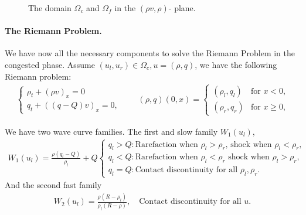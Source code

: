 \documentclass[10pt]{article}
\numberwithin{equation}{section}
\begin{document}

\begin{figure}
    \centering
    
    \caption{The domain $\Omega_c$ and $\Omega_f$ in the $(\rho v , \rho)$- plane.}
    \label{fig:RhoVFigure}
\end{figure}


\paragraph{The Riemann Problem.}
We have now all the necessary components to solve the Riemann Problem in the congested phase. Assume $(u_l, u_r) \in \Omega_c, u = (\rho, q)$, we have the following Riemann problem: 
\begin{align}
     \begin{cases} \rho_t + (\rho v)_x = 0 \\
     q_t + ((q-Q)v)_x = 0 ,
    \end{cases} \quad \quad (\rho, q) (0,x) = \begin{cases}
    (\rho_l, q_l) & \text{for $x < 0$,} \\
    (\rho_r, q_r) &  \text{for $x \geq 0$,}
    \end{cases}
    \label{Eq:RPCongestedPhase}
\end{align}

We have two wave curve families. The first and slow family $W_1(u_l)$, 
\begin{align*}
     W_1(u_l) = \frac{\rho( q_l - Q)}{\rho_l} + Q  \begin{cases}
          q_l > Q:  \text{Rarefaction when $\rho_l > \rho_r$, shock when $\rho_l < \rho_r$,}\\
          q_l < Q: \text{Rarefaction when $\rho_l < \rho_r$ shock when $\rho_l > \rho_r$,} \\
          q_l = Q:  \text{Contact discontinuity for all $\rho_l, \rho_r$. } \
     \end{cases}
\end{align*}
And the second fast family 
\begin{align*}
     W_2(u_l) = \frac{\rho( R - \rho_l)}{\rho_l( R - \rho)}, \quad \text{Contact discontinuity for all $u$.}
\end{align*}
\end{document}
